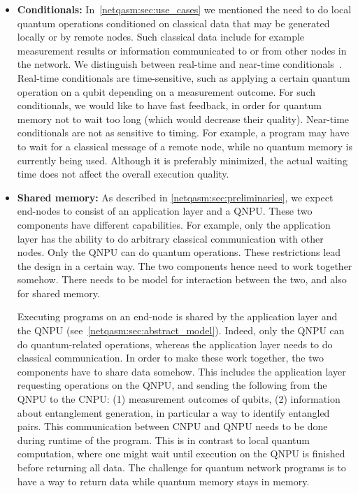 \begin{itemize}
      \item \label{item:design_cond} \textbf{Conditionals:}
            In~\cref{netqasm:sec:use_cases} we mentioned the need to do local quantum operations conditioned on classical data that may be generated locally or by remote nodes. Such classical data include for example measurement results or information communicated to or from other nodes in the network.
            We distinguish between real-time and near-time conditionals~\cite{cross2021openqasm}.
            Real-time conditionals are time-sensitive, such as applying a certain quantum operation on a qubit depending on a measurement outcome.
            For such conditionals, we would like to have fast feedback, in order for quantum memory not to wait too long (which would decrease their quality).
            Near-time conditionals are not as sensitive to timing.
            For example, a program may have to wait for a classical message of a remote node, while no quantum memory is currently being used.
            Although it is preferably minimized, the actual waiting time does not affect the overall execution quality.


      \item \label{item:design_return} \textbf{Shared memory:}
            As described in \cref{netqasm:sec:preliminaries}, we expect end-nodes to consist of an application layer and a \ac{QNPU}.
            These two components have different capabilities.
            For example, only the application layer has the ability to do arbitrary classical communication with other nodes.
            Only the \ac{QNPU} can do quantum operations.
            These restrictions lead the design in a certain way.
            The two components hence need to work together somehow.
            There needs to be model for interaction between the two, and also for shared memory.

            Executing programs on an end-node is shared by the application layer and the \ac{QNPU} (see~\cref{netqasm:sec:abstract_model}).
            Indeed, only the \ac{QNPU} can do quantum-related operations, whereas the application layer needs to do classical communication.
            In order to make these work together, the two components have to share data somehow.
            This includes the application layer requesting operations on the \ac{QNPU}, and sending the following from the \ac{QNPU} to the \ac{CNPU}:
                (1) measurement outcomes of qubits,
                (2) information about entanglement generation, in particular a way to identify entangled pairs.
            This communication between \ac{CNPU} and \ac{QNPU} needs to be done during runtime of the program.
            This is in contrast to local quantum computation, where one might wait until execution on the \ac{QNPU} is finished before returning all data.
            The challenge for quantum network programs is to have a way to return data while quantum memory stays in memory.


\end{itemize}
